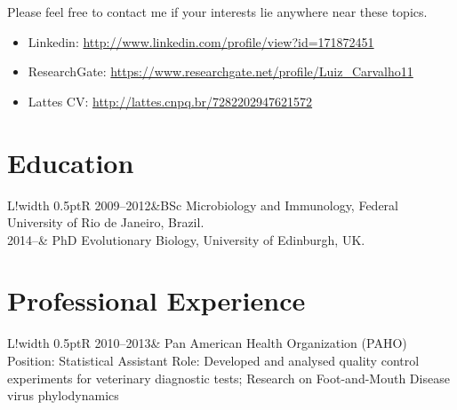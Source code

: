 \documentclass[10pt]{article}
\newcommand\VRule{\color{lightgray}\vrule width 0.5pt}
\begin{document}
Please feel free to contact me if your interests lie anywhere near these topics.

\begin{itemize}
\itemsep0.1em
 \item[] Linkedin: \url{http://www.linkedin.com/profile/view?id=171872451}\\
 \item[] ResearchGate: \url{https://www.researchgate.net/profile/Luiz_Carvalho11}\\
 \item[] Lattes CV: \url{ http://lattes.cnpq.br/7282202947621572} 
\end{itemize}
\newpage
\section*{Education}
\begin{tabular}{L!{\VRule}R}
2009--2012&BSc Microbiology and Immunology, Federal University of Rio de Janeiro, Brazil.\\
2014--& PhD Evolutionary Biology, University of Edinburgh, UK.
\end{tabular}

\section*{Professional Experience}
\begin{tabular}{L!{\VRule}R}
2010--2013&{
Pan American Health Organization (PAHO)\newline
Position: Statistical Assistant\newline
Role: Developed and analysed quality control experiments for veterinary diagnostic tests;\newline
Research on Foot-and-Mouth Disease virus phylodynamics 
}
\end{tabular}
\end{document}
